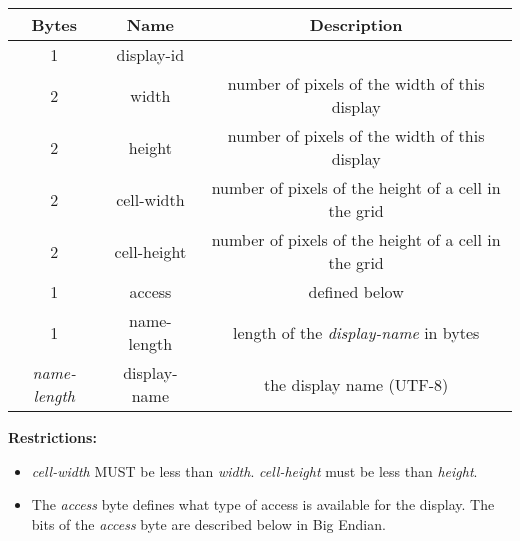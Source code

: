 \documentclass{article}
\begin{document}
    \begin{center}
        \begin{tabular}{|c|c|c|}
            \hline
            \textbf{Bytes}     & \textbf{Name} & \textbf{Description}                                 \\
            \hline
            1                  & display-id    &                                                      \\
            \hline
            2                  & width         & number of pixels of the width of this display        \\
            \hline
            2                  & height        & number of pixels of the width of this display        \\
            \hline
            2                  & cell-width    & number of pixels of the height of a cell in the grid \\
            \hline
            2                  & cell-height   & number of pixels of the height of a cell in the grid \\
            \hline
            1                  & access        & defined below                                        \\
            \hline
            1                  & name-length   & length of the \emph{display-name} in bytes           \\
            \hline
            \emph{name-length} & display-name  & the display name (UTF-8)                             \\
            \hline
        \end{tabular}
    \end{center}

    \textbf{Restrictions:}

    \begin{itemize}
        \item \emph{cell-width} MUST be less than \emph{width}. \emph{cell-height} must be less than \emph{height}.\\ %
        \item The \emph{access} byte defines what type of access is available for the display. The bits of the \emph{access} byte are described below in Big Endian.
    \end{itemize}
\end{document}
